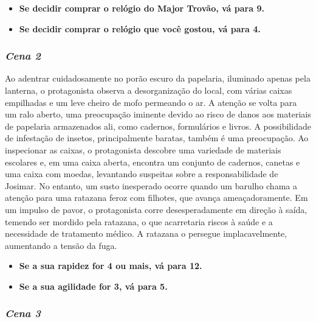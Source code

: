 \begin{itemize}
	\item \textbf{Se decidir comprar o relógio do Major Trovão, vá para 9.}
	\item \textbf{Se decidir comprar o relógio que você gostou, vá para 4.}
\end{itemize}

\bigskip\medskip

\subsubsection*{\textit{\textbf{Cena 2}}}

Ao adentrar cuidadosamente no porão escuro da papelaria, iluminado apenas pela lanterna, o protagonista observa a desorganização do local, com várias caixas empilhadas e um leve cheiro de mofo permeando o ar. A atenção se volta para um ralo aberto, uma preocupação iminente devido ao risco de danos aos materiais de papelaria armazenados ali, como cadernos, formulários e livros. A possibilidade de infestação de insetos, principalmente baratas, também é uma preocupação. Ao inspecionar as caixas, o protagonista descobre uma variedade de materiais escolares e, em uma caixa aberta, encontra um conjunto de cadernos, canetas e uma caixa com moedas, levantando suspeitas sobre a responsabilidade de Josimar. No entanto, um susto inesperado ocorre quando um barulho chama a atenção para uma ratazana feroz com filhotes, que avança ameaçadoramente. Em um impulso de pavor, o protagonista corre desesperadamente em direção à saída, temendo ser mordido pela ratazana, o que acarretaria riscos à saúde e a necessidade de tratamento médico. A ratazana o persegue implacavelmente, aumentando a tensão da fuga.

\begin{itemize}
	\item \textbf{Se a sua rapidez for 4 ou mais, vá para 12.}
	\item \textbf{Se a sua agilidade for 3, vá para 5.}
\end{itemize}

\bigskip\medskip

\subsubsection*{\textit{\textbf{Cena 3}}}

